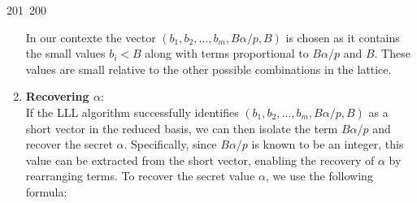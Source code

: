 201~200~\documentclass{article}
\begin{document}
\begin{enumerate}
	                                                                        	                                                                    	                                	                    	                    	                        	                        	                    	                                                                	                	                                                        In our contexte the vector \((b_1, b_2, \ldots, b_m, B\alpha/p, B)\) is chosen as it contains the small values \(b_i < B\) along with terms proportional to \(B\alpha/p\) and \(B\). These values are small relative to the other possible combinations in the lattice.

	                                                                        	                                                                    	                                	                    	                    	                        	                        	                    	                                                                	                	                                                            \item \textbf{Recovering \(\alpha\)}: \\
	                                                                        	                                                                    	                                	                    	                    	                        	                        	                    	                                                                	                	                                                                If the LLL algorithm successfully identifies \((b_1, b_2, \ldots, b_m, B\alpha/p, B)\) as a short vector in the reduced basis, we can then isolate the term \(B\alpha/p\) and recover the secret \(\alpha\). Specifically, since \(B\alpha/p\) is known to be an integer, this value can be extracted from the short vector, enabling the recovery of \(\alpha\) by rearranging terms. 
	                                                                        	                                                                    	                                	                    	                    	                        	                        	                    	                                                                	                	                                                                    To recover the secret value \(\alpha\), we use the following formula:


\end{enumerate}
\end{document}
